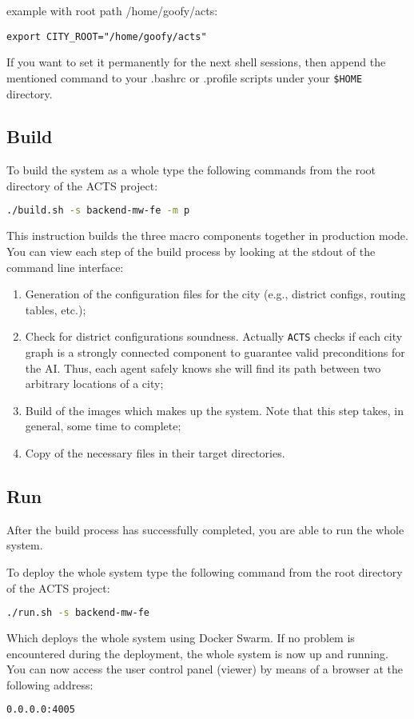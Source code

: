 example with root path /home/goofy/acts:
\begin{lstlisting}
export CITY_ROOT="/home/goofy/acts"
\end{lstlisting}

If you want to set it permanently for the next shell sessions,
then append the mentioned command
to your .bashrc or .profile scripts under your
\texttt{\$HOME} directory.

\subsection{Build}\label{sec:sys-build}

To build the system as a whole type the following commands from the root
directory of the ACTS project:

\begin{lstlisting}[language=bash]
./build.sh -s backend-mw-fe -m p
\end{lstlisting}

This instruction builds the three macro components together in production mode.
You can view each step of the build process by looking at the stdout of the
command line interface:

\begin{enumerate}
\item Generation of the configuration files for the city (e.g., district
  configs, routing tables, etc.);
\item Check for district configurations soundness. Actually \texttt{ACTS}
  checks if each city graph is a strongly connected component to guarantee
  valid preconditions for the AI. Thus, each agent safely knows she will
  find its path between two arbitrary locations of a city;
\item Build of the images which makes up the system. Note that this step
  takes, in general, some time to complete;
\item Copy of the necessary files in their target directories.
\end{enumerate}

\subsection{Run}\label{sec:sys-run}

After the build process has successfully completed, you are able to
run the whole system.

To deploy the whole system type the following command from the root directory
of the ACTS project:

\begin{lstlisting}[language=bash]
./run.sh -s backend-mw-fe
\end{lstlisting}

Which deploys the whole system using Docker Swarm.
If no problem is encountered during the deployment, the whole system is now up
and running.
You can now access the user control panel (viewer) by means of a browser at the
following address:

\begin{lstlisting}[language=bash]
0.0.0.0:4005
\end{lstlisting}
